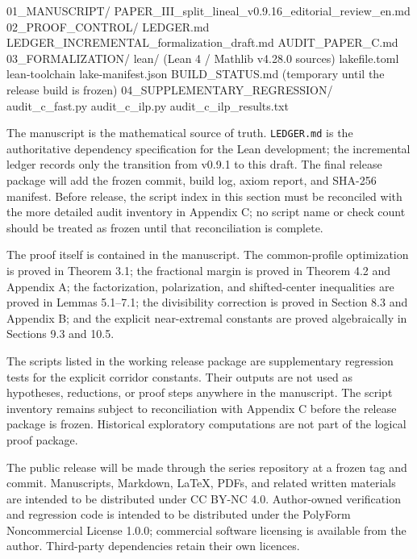 \documentclass[
  11pt,
]{article}
\newenvironment{Shaded}{}{}
\newcommand{\NormalTok}[1]{#1}
\begin{document}
\begin{Shaded}
\begin{Highlighting}[]
\NormalTok{01\_MANUSCRIPT/}
\NormalTok{    PAPER\_III\_split\_lineal\_v0.9.16\_editorial\_review\_en.md}
\NormalTok{02\_PROOF\_CONTROL/}
\NormalTok{    LEDGER.md}
\NormalTok{    LEDGER\_INCREMENTAL\_formalization\_draft.md}
\NormalTok{    AUDIT\_PAPER\_C.md}
\NormalTok{03\_FORMALIZATION/}
\NormalTok{    lean/                         (Lean 4 / Mathlib v4.28.0 sources)}
\NormalTok{    lakefile.toml}
\NormalTok{    lean{-}toolchain}
\NormalTok{    lake{-}manifest.json}
\NormalTok{    BUILD\_STATUS.md               (temporary until the release build is frozen)}
\NormalTok{04\_SUPPLEMENTARY\_REGRESSION/}
\NormalTok{    audit\_c\_fast.py}
\NormalTok{    audit\_c\_ilp.py}
\NormalTok{    audit\_c\_ilp\_results.txt}
\end{Highlighting}
\end{Shaded}

The manuscript is the mathematical source of truth. \texttt{LEDGER.md}
is the authoritative dependency specification for the Lean development;
the incremental ledger records only the transition from v0.9.1 to this
draft. The final release package will add the frozen commit, build log,
axiom report, and SHA-256 manifest. Before release, the script index in
this section must be reconciled with the more detailed audit inventory
in Appendix C; no script name or check count should be treated as frozen
until that reconciliation is complete.

The proof itself is contained in the manuscript. The common-profile
optimization is proved in Theorem 3.1; the fractional margin is proved
in Theorem 4.2 and Appendix A; the factorization, polarization, and
shifted-center inequalities are proved in Lemmas 5.1--7.1; the
divisibility correction is proved in Section 8.3 and Appendix B; and the
explicit near-extremal constants are proved algebraically in Sections
9.3 and 10.5.

The scripts listed in the working release package are supplementary
regression tests for the explicit corridor constants. Their outputs are
not used as hypotheses, reductions, or proof steps anywhere in the
manuscript. The script inventory remains subject to reconciliation with
Appendix C before the release package is frozen. Historical exploratory
computations are not part of the logical proof package.

The public release will be made through the series repository at a
frozen tag and commit. Manuscripts, Markdown, LaTeX, PDFs, and related
written materials are intended to be distributed under CC BY-NC 4.0.
Author-owned verification and regression code is intended to be
distributed under the PolyForm Noncommercial License 1.0.0; commercial
software licensing is available from the author. Third-party
dependencies retain their own licences.
\end{document}
